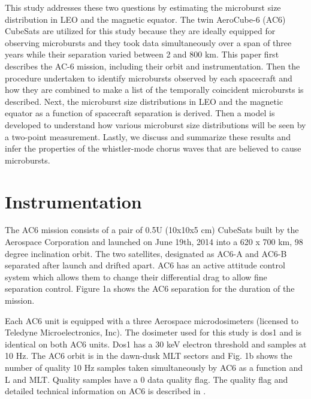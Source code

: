 \documentclass[draft]{agujournal2019}
\begin{document}
This study addresses these two questions by estimating the microburst size distribution in LEO and the magnetic equator. The twin AeroCube-6 (AC6) CubeSats are utilized for this study because they are ideally equipped for observing microbursts and they took data simultaneously over a span of three years while their separation varied between 2 and 800 km. This paper first describes the AC-6 mission, including their orbit and instrumentation. Then the procedure undertaken to identify microbursts observed by each spacecraft and how they are combined to make a list of the temporally coincident microbursts is described. Next, the microburst size distributions in LEO and the magnetic equator as a function of spacecraft separation is derived. Then a model is developed to understand how various microburst size distributions will be seen by a two-point measurement. Lastly, we discuss and summarize these results and infer the properties of the whistler-mode chorus waves that are believed to cause microbursts. 

\section{Instrumentation}
The AC6 mission consists of a pair of 0.5U (10x10x5 cm) CubeSats built by the Aerospace Corporation and launched on June 19th, 2014 into a 620 x 700 km, 98 degree inclination orbit. The two satellites, designated as AC6-A and AC6-B separated after launch and drifted apart. AC6 has an active attitude control system which allows them to change their differential drag to allow fine separation control. Figure 1a shows the AC6 separation for the duration of the mission.

Each AC6 unit is equipped with a three Aerospace microdosimeters (licensed to Teledyne Microelectronics, Inc). The dosimeter used for this study is dos1 and is identical on both AC6 units. Dos1 has a 30 keV electron threshold and samples at 10 Hz. The AC6 orbit is in the dawn-dusk MLT sectors and Fig. 1b shows the number of quality 10 Hz samples taken simultaneously by AC6 as a function and L and MLT. Quality samples have a 0 data quality flag. The quality flag and detailed technical information on AC6 is described in .
\end{document}
